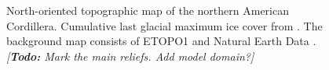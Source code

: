 \documentclass{article}
\newcommand{\todo}[1]{\emph{[\textbf{Todo:} #1]}}
\begin{document}
\begin{figure}
  \centering
  \caption{North-oriented topographic map of the northern American Cordillera.
           Cumulative last glacial maximum ice cover from \citet{Dyke.2004}.
           The background map consists of ETOPO1 \citep{Amante.Eakins.2009}
           and Natural Earth Data \citep{Patterson.Kelso.2014}.
           \todo{Mark the main reliefs. Add model domain?}}
  \label{fig:locmap}
\end{figure}
\end{document}
